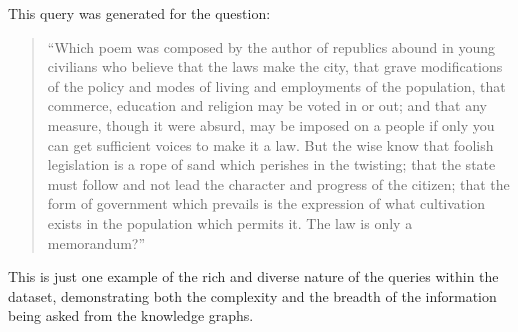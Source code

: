 This query was generated for the question:

\begin{quote}
\textquotedblleft Which poem was composed by the author of republics abound in young civilians who believe that the laws make the city, that grave modifications of the policy and modes of living and employments of the population, that commerce, education and religion may be voted in or out; and that any measure, though it were absurd, may be imposed on a people if only you can get sufficient voices to make it a law. But the wise know that foolish legislation is a rope of sand which perishes in the twisting; that the state must follow and not lead the character and progress of the citizen; that the form of government which prevails is the expression of what cultivation exists in the population which permits it. The law is only a memorandum?\textquotedblright{}
\end{quote}

This is just one example of the rich and diverse nature of the queries within the dataset, demonstrating both the complexity and the breadth of the information being asked from the knowledge graphs.
